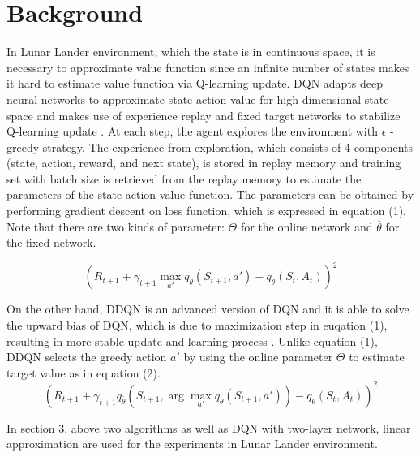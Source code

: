 \documentclass{article}
\begin{document}
\section{Background}
In Lunar Lander environment, which the state is in continuous space, it is necessary to approximate value function since an infinite number of states makes it hard to estimate value function via Q-learning update. DQN adapts deep neural networks to approximate state-action value for high dimensional state space and makes use of experience replay and fixed target networks to stabilize Q-learning update \cite{mnih2015human}. At each step, the agent explores the environment with $\epsilon$ - greedy strategy. The experience from exploration, which consists of 4 components (state, action, reward, and next state), is stored in replay memory and training set with batch size is retrieved from the replay memory to estimate the parameters of the state-action value function. The parameters can be obtained by performing gradient descent on loss function, which is expressed in equation (1). Note that there are two kinds of parameter: $\Theta$ for the online network and $\overline{\theta}$ for the fixed network.

\begin{equation}
(R_{t+1} + \gamma_{t+1}\max_{{a'}} q_{\overline{\theta}}(S_{t+1}, a')- q_\theta(S_t, A_t))^{2}
\end{equation} 

On the other hand, DDQN is an advanced version of DQN and it is able to solve the upward bias of DQN, which is due to maximization step in euqation (1), resulting in more stable update and learning process \cite{van2016deep}. Unlike equation (1), DDQN selects the greedy action $a'$ by using the online parameter $\Theta$ to estimate target value as in equation (2). 
\begin{equation}
(R_{t+1} + \gamma_{t+1}q_{\overline{\theta}}(S_{t+1},  \arg\max_{a'} q_\theta(S_{t+1}, a'))- q_\theta(S_t, A_t))^{2}
\end{equation} 

In section 3, above two algorithms as well as DQN with two-layer network, linear approximation are used for the experiments in Lunar Lander environment.
\end{document}
